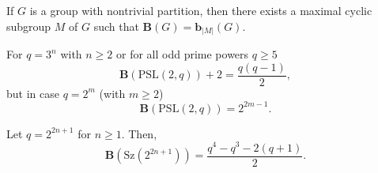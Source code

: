 \documentclass[10pt,a4paper]{amsart}
\begin{document}
\begin{theorem}\label{l0} If $G$ is a group with nontrivial partition, then there exists a maximal cyclic subgroup $M$ of $G$ such that $\mathbf{B}(G)=\mathbf{b}_{|M|}(G).$
\end{theorem} 

\begin{corollary}\label{l1}For $q=3^n$ with $n \ge 2$ or for all odd prime powers $q \ge 5$
 \begin{equation} \label{pslodd}
 \mathbf{B}(\mathrm{PSL}(2,q)) + 2 = \frac{q(q-1)}{2},
 \end{equation} but in case $q=2^m$ (with $m \ge 2$)
 \begin{equation}\mathbf{B}(\mathrm{PSL}(2,q)) = 2^{2m-1}.
 \end{equation}
\end{corollary}

\begin{corollary}\label{l2} Let $q=2^{2n+1}$ for $n \ge 1$. Then,
\begin{equation}\mathbf{B}(\mathrm{Sz}(2^{2n+1}))= \frac{q^4-q^3-2(q+1)}{2}.
 \end{equation} 
\end{corollary}
\end{document}
